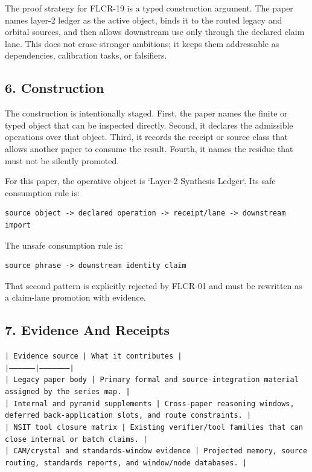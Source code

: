\documentclass[11pt]{article}
\begin{document}
The proof strategy for FLCR-19 is a typed construction argument. The paper names layer-2 ledger as the active object, binds it to the routed legacy and orbital sources, and then allows downstream use only through the declared claim lane. This does not erase stronger ambitions; it keeps them addressable as dependencies, calibration tasks, or falsifiers.

\subsection*{6. Construction}

The construction is intentionally staged. First, the paper names the finite or
typed object that can be inspected directly. Second, it declares the admissible
operations over that object. Third, it records the receipt or source class that
allows another paper to consume the result. Fourth, it names the residue that
must not be silently promoted.

For this paper, the operative object is `Layer-2 Synthesis Ledger`. Its safe consumption
rule is:

\begin{verbatim}
source object -> declared operation -> receipt/lane -> downstream import
\end{verbatim}

The unsafe consumption rule is:

\begin{verbatim}
source phrase -> downstream identity claim
\end{verbatim}

That second pattern is explicitly rejected by FLCR-01 and must be rewritten as
a claim-lane promotion with evidence.

\subsection*{7. Evidence And Receipts}

\noindent\texttt{| Evidence source | What it contributes |}\\
\noindent\texttt{|-----------------|---------------------|}\\
\noindent\texttt{| Legacy paper body | Primary formal and source-integration material assigned by the series map. |}\\
\noindent\texttt{| Internal and pyramid supplements | Cross-paper reasoning windows, deferred back-application slots, and route constraints. |}\\
\noindent\texttt{| NSIT tool closure matrix | Existing verifier/tool families that can close internal or batch claims. |}\\
\noindent\texttt{| CAM/crystal and standards-window evidence | Projected memory, source routing, standards reports, and window/node databases. |}\\
\end{document}
